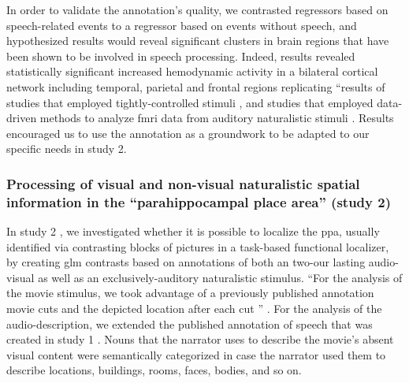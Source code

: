 %
In order to validate the annotation's quality, we contrasted regressors based on
speech-related events to a regressor based on events without speech, and
hypothesized results would reveal significant clusters in brain regions that
have been shown to be involved in speech processing.
%
Indeed, results revealed statistically significant increased hemodynamic
activity in a bilateral cortical network including temporal, parietal and
frontal regions replicating ``results of studies that employed
tightly-controlled stimuli \citep[s.][for reviews]{friederici2011brain,
hickok2007cortical,price2012twentyyears}, and studies that employed data-driven
methods to analyze \ac{fmri} data from auditory naturalistic stimuli
\citep{honey2012not, lerner2011topographic, silbert2014coupled}.
%
Results encouraged us to use the annotation as a groundwork to be adapted to our
specific needs in study 2.


\subsubsection{Processing of visual and non-visual naturalistic spatial
information in the ``parahippocampal place area'' (study 2)}

In study 2 \citep{haeusler2022processing}, we investigated whether it is
possible to localize the \ac{ppa}, usually identified via contrasting blocks of
pictures in a task-based functional localizer, by creating \ac{glm} contrasts
based on annotations of both an two-our lasting audio-visual as well as an
exclusively-auditory naturalistic stimulus.
``For the analysis of the movie stimulus, we took advantage of a previously
published annotation movie cuts and the depicted location after each cut
\citep{haeusler2016cutanno}'' \citep{haeusler2022processing}.
For the analysis of the audio-description, we extended the published annotation
of speech that was created in study 1 \citep{haeusler2021speechanno}.
%
Nouns that the narrator uses to describe the movie's absent visual content were
semantically categorized in case the narrator used them to describe locations,
buildings, rooms, faces, bodies, and so on.

